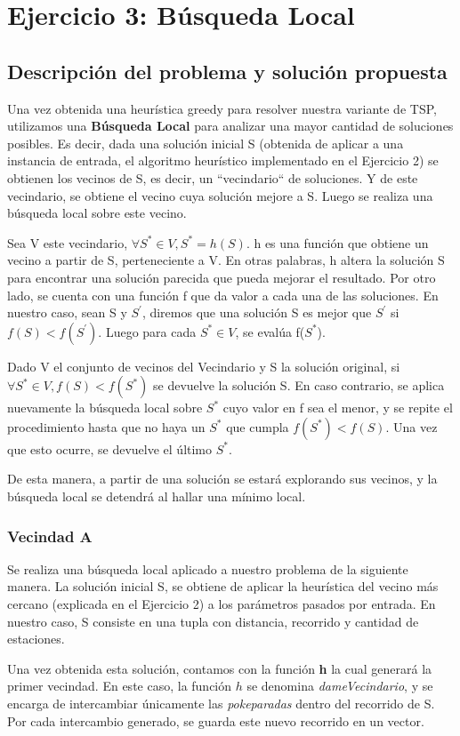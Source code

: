 \section{Ejercicio 3: Búsqueda Local}
    \subsection{Descripción del problema y solución propuesta}

    \par Una vez obtenida una heurística greedy para resolver nuestra variante de TSP, utilizamos una \textbf{Búsqueda Local} para analizar una mayor cantidad de soluciones posibles. Es decir, dada una solución inicial S (obtenida de aplicar a una instancia de entrada, el algoritmo heurístico implementado en el Ejercicio 2) se obtienen los vecinos de S, es decir, un “vecindario“ de soluciones. Y de este vecindario, se obtiene el vecino cuya solución mejore a S. Luego se realiza una búsqueda local sobre este vecino. 
    \par Sea V este vecindario, $\forall S^{*}\in V, S^{*} = h(S)$. h es una función que obtiene un vecino a partir de S, perteneciente a V. En otras palabras, h altera la solución S para encontrar una solución parecida que pueda mejorar el resultado. Por otro lado, se cuenta con una función f que da valor a cada una de las soluciones. En nuestro caso, sean S y $S^{'}$, diremos que una solución S es mejor que $S^{'}$ si $f(S) < f(S^{'})$. Luego para cada $S^{*}\in V$, se evalúa f($S^{*}$). 
    \par Dado V el conjunto de vecinos del Vecindario y S la solución original, si $\forall S^{*}\in V, f(S) < f(S^{*})$  se devuelve la solución S. En caso contrario, se aplica nuevamente la búsqueda local sobre $S^{*}$ cuyo valor en f sea el menor, y se repite el procedimiento hasta que no haya un $S^{*}$ que cumpla $f(S^{*}) < f(S)$. Una vez que esto ocurre, se devuelve el último $S^{*}$. 
    \par De esta manera, a partir de una solución se estará explorando sus vecinos, y la búsqueda local se detendrá al hallar una mínimo local.

    \subsubsection{Vecindad A}

    \par Se realiza una búsqueda local aplicado a nuestro problema de la siguiente manera. La solución inicial S, se obtiene de aplicar la heurística del vecino más cercano (explicada en el Ejercicio 2) a los parámetros pasados por entrada. En nuestro caso, S consiste en una tupla con distancia, recorrido y cantidad de estaciones.
    \par Una vez obtenida esta solución, contamos con la función \textbf{h} la cual generará la primer vecindad. En este caso, la función $h$ se denomina \emph{dameVecindario}, y se encarga de intercambiar únicamente las \emph{pokeparadas} dentro del recorrido de S. Por cada intercambio generado, se guarda este nuevo recorrido en un vector.

